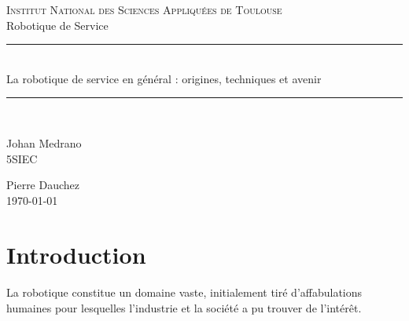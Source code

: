 \documentclass[a4paper,10pt]{article}
\newcommand{\HRule}{\rule{\linewidth}{0.3mm}}
\begin{document}
\sffamily
    \begin{titlepage}
        \begin{sffamily}
        \begin{center}
    
        \textsc{\Large Institut National des Sciences Appliquées de Toulouse}\\[5.5cm]
    
        \LARGE Robotique de Service\\[1.5cm]
    
        \HRule \\[0.5cm]
        { \huge La robotique de service en général : origines, techniques et avenir\\[0.4cm] }
    
        \HRule \\[4cm]
        \vfill
    
       \begin{minipage}{0.4\textwidth}
          \begin{flushleft} \large
            Johan Medrano\\
            5SIEC
          \end{flushleft}
       \end{minipage}
       \begin{minipage}{0.4\textwidth}
          \begin{flushright} \large
            Pierre Dauchez\\
            \today
          \end{flushright}
       \end{minipage}
    
        \end{center}
        \end{sffamily}
    \end{titlepage}
    
    \tableofcontents
    \newpage
    
    \section*{Introduction}
    
        \paragraph{}
            La robotique constitue un domaine vaste, initialement tiré d'affabulations 
            humaines pour lesquelles l'industrie et la société a pu trouver de l'intérêt. 
            
\end{document}
